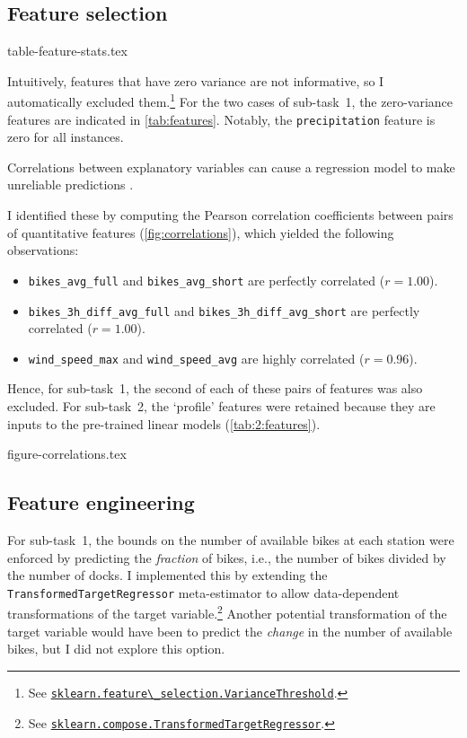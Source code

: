 \documentclass[11pt]{extarticle}
\newcommand{\windspeedmax}{\texttt{wind\_speed\_max}}
\newcommand{\windspeedavg}{\texttt{wind\_speed\_avg}}
\newcommand{\bikesavgfull}{\texttt{bikes\_avg\_full}}
\newcommand{\bikesavgshort}{\texttt{bikes\_avg\_short}}
\newcommand{\bikeshdiffavgfull}{\texttt{bikes\_3h\_diff\_avg\_full}}
\newcommand{\bikeshdiffavgshort}{\texttt{bikes\_3h\_diff\_avg\_short}}
\newcommand{\sklearn}[2]{\href{https://scikit-learn.org/stable/modules/generated/sklearn.#1.#2.html}{\lstinline|sklearn.#1.#2|}}
\begin{document}
\subsection{Feature selection}
\label{sec:feature-selection}

{table-feature-stats.tex}

Intuitively, features that have zero variance are not informative, so I automatically
excluded them.\footnote{See \sklearn{feature\_selection}{VarianceThreshold}.
}
For the two cases of sub-task~1, the zero-variance features are indicated in
\cref{tab:features}.
Notably, the \texttt{precipitation} feature is zero for all instances.

Correlations between explanatory variables can cause a regression model to make
unreliable predictions \parencite{Alin2010}.
\begin{samepage}
  I identified these by computing the Pearson correlation
  coefficients between pairs of quantitative features (\cref{fig:correlations}), which
  yielded the following observations:
  \begin{itemize}
    \item \texttt{\bikesavgfull} and \texttt{\bikesavgshort} are perfectly correlated ($r = 1.00$).
    \item \texttt{\bikeshdiffavgfull} and \texttt{\bikeshdiffavgshort} are perfectly correlated ($r  = 1.00$).
    \item \texttt{\windspeedmax} and \texttt{\windspeedavg} are highly correlated ($r = 0.96$).
  \end{itemize}
\end{samepage}
Hence, for sub-task~1, the second of each of these pairs of features was also excluded.
For sub-task~2, the `profile' features were retained because they are inputs to the
pre-trained linear models (\cref{tab:2:features}).

{figure-correlations.tex}

\subsection{Feature engineering}
\label{sec:feature-engineering}

For sub-task~1, the bounds on the number of available bikes at each station were
enforced by predicting the \emph{fraction} of bikes, i.e., the number of bikes divided
by the number of docks.
I implemented this by extending the \texttt{TransformedTargetRegressor} meta-estimator
to allow data-dependent transformations of the target variable.\footnote{See
  \sklearn{compose}{TransformedTargetRegressor}.
}
Another potential transformation of the target variable would have been to predict the
\emph{change} in the number of available bikes, but I did not explore this option.
\end{document}
